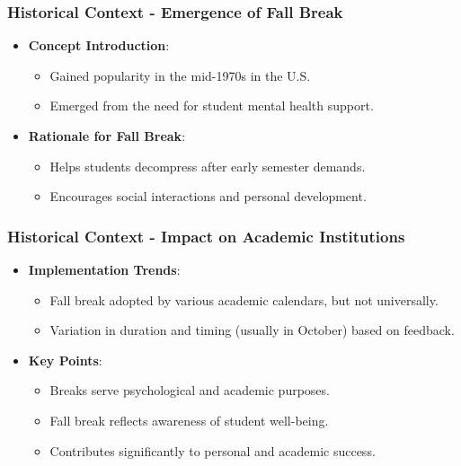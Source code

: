 \documentclass[aspectratio=169]{beamer}
\begin{document}
\begin{frame}[fragile]
    \frametitle{Historical Context - Emergence of Fall Break}
    \begin{itemize}
        \item \textbf{Concept Introduction}:
        \begin{itemize}
            \item Gained popularity in the mid-1970s in the U.S.
            \item Emerged from the need for student mental health support.
        \end{itemize}
        \item \textbf{Rationale for Fall Break}:
        \begin{itemize}
            \item Helps students decompress after early semester demands.
            \item Encourages social interactions and personal development.
        \end{itemize}
    \end{itemize}
\end{frame}

\begin{frame}[fragile]
    \frametitle{Historical Context - Impact on Academic Institutions}
    \begin{itemize}
        \item \textbf{Implementation Trends}:
        \begin{itemize}
            \item Fall break adopted by various academic calendars, but not universally.
            \item Variation in duration and timing (usually in October) based on feedback.
        \end{itemize}
        \item \textbf{Key Points}:
        \begin{itemize}
            \item Breaks serve psychological and academic purposes.
            \item Fall break reflects awareness of student well-being.
            \item Contributes significantly to personal and academic success.
        \end{itemize}
    \end{itemize}
\end{frame}
\end{document}

